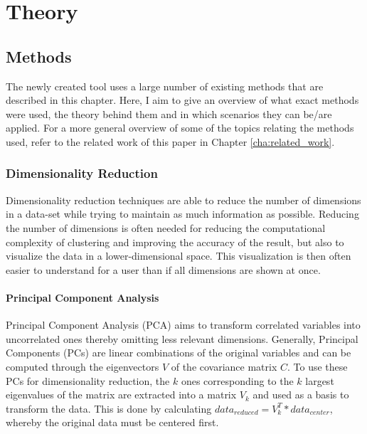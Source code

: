 \documentclass[
	a4paper,
	english,
	twoside,
	openright,               
	11pt                            
	]{report}
\begin{document}
\part{Theory}
\chapter{Methods}\label{cha:methods}
The newly created tool uses a large number of existing methods that are described in this chapter. Here, I aim to give an overview of what exact methods were used, the theory behind them and in which scenarios they can be/are applied. For a more general overview of some of the topics relating the methods used, refer to the related work of this paper in Chapter \ref{cha:related_work}.

\section{Dimensionality Reduction}\label{sec:dim_reduction}
Dimensionality reduction techniques are able to reduce the number of dimensions in a data-set while trying to maintain as much information as possible. Reducing the number of dimensions is often needed for reducing the computational complexity of clustering and improving the accuracy of the result, but also to visualize the data in a lower-dimensional space. This visualization is then often easier to understand for a user than if all dimensions are shown at once.

\subsection{Principal Component Analysis}
 Principal Component Analysis (PCA) \cite{pca} aims to transform correlated variables into uncorrelated ones thereby omitting less relevant dimensions. Generally, Principal Components (PCs) are linear combinations of the original variables and can be computed through the eigenvectors $V$ of the covariance matrix $C$. To use these PCs for dimensionality reduction, the $k$ ones corresponding to the $k$ largest eigenvalues of the matrix are extracted into a matrix $V_k$ and used as a basis to transform the data. This is done by calculating $data_{reduced}=V_k^T*data_{center}$, whereby the original data must be centered first.
\end{document}
